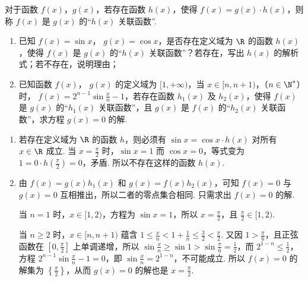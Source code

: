 \begin{problem}
对于函数 \( f(x) \)，\( g(x) \)，若存在函数 \( h(x) \)，使得 \( f(x)=g(x)\cdot h(x) \)，则称 \( f(x) \) 是 \( g(x) \) 的“\( h(x) \) 关联函数”.

\begin{enumerate}
\item 已知 \( f(x)=\sin x \)， \( g(x)=\cos x \)，是否存在定义域为 \( \R \) 的函数 \( h(x) \)，使得 \( f(x) \) 是 \( g(x) \) 的“\( h(x) \) 关联函数”？若存在，写出 \( h(x) \) 的解析式；若不存在，说明理由；
\item 已知函数 \( f(x) \)， \( g(x) \) 的定义域为 \( [1,+\infty) \)，当 \( x\in[n,n+1) \)，（\( n\in\N^* \)）时， \( f(x)=2^{n-1}\sin\frac{x}{n}-1 \)，若存在函数 \( h_1(x) \) 及 \( h_2(x) \)，使得 \( f(x) \) 是 \( g(x) \) 的“\( h_1(x) \) 关联函数”，且 \( g(x) \) 是 \( f(x) \) 的“\( h_2(x) \) 关联函数”，求方程 \( g(x)=0 \) 的解.
\end{enumerate}

\begin{solution}
\begin{enumerate}
\item 若存在定义域为 \(\R\) 的函数 \(h\)，则必须有 \(\sin x=\cos x\cdot h(x)\) 对所有 \(x\in\R\) 成立. 当 \(x=\frac\pi2\) 时，\(\sin x=1\) 而 \(\cos x=0\)，等式变为 \(1=0\cdot h\left(\frac\pi2\right)=0\)，矛盾. 所以不存在这样的函数 \(h(x)\).

\item 由 \(f(x)=g(x)h_1(x)\) 和 \(g(x)=f(x)h_2(x)\)，可知 \(f(x)=0\) 与 \(g(x)=0\) 互相推出，所以二者的零点集合相同. 只需求出 \(f(x)=0\) 的解.

当 \(n=1\) 时，\(x\in[1,2)\)，方程为 \(\sin x=1\)，所以 \(x=\frac\pi2\)，且 \(\frac\pi2\in[1,2)\).

当 \(n\geq2\) 时，\(x\in[n,n+1)\) 蕴含 \(1\leq\frac{x}{n}<1+\frac1n\leq\frac32<\frac\pi2\). 又因 \(1>\frac\pi6\)，且正弦函数在 \(\left[0,\frac\pi2\right]\) 上单调递增，所以 \(\sin\frac{x}{n}\geq\sin1>\sin\frac\pi6=\frac12\)，而 \(2^{1-n}\leq\frac12\)，方程 \(2^{n-1}\sin\frac{x}{n}-1=0\)，即 \(\sin\frac{x}{n}=2^{1-n}\)，不可能成立. 所以 \(f(x)=0\) 的解集为 \(\left\{\frac\pi2\right\}\)，从而 \(g(x)=0\) 的解也是 \(x=\frac\pi2\).
\end{enumerate}
\end{solution}
\end{problem}
